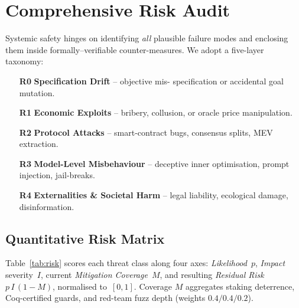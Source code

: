 \documentclass[11pt]{article}
\theoremstyle{plain}
\begin{document}
\section{Comprehensive Risk Audit}\label{sec:risk}

Systemic safety hinges on identifying \emph{all} plausible failure
modes and enclosing them inside formally–verifiable counter-measures.
We adopt a five-layer taxonomy:

\begin{enumerate}\itemsep2pt
\item[\textbf{R0}] \textbf{Specification Drift} – objective mis-
        specification or accidental goal mutation.
\item[\textbf{R1}] \textbf{Economic Exploits} – bribery, collusion, or
        oracle price manipulation.
\item[\textbf{R2}] \textbf{Protocol Attacks} – smart-contract bugs,
        consensus splits, MEV extraction.
\item[\textbf{R3}] \textbf{Model-Level Misbehaviour} – deceptive inner
        optimisation, prompt injection, jail-breaks.
\item[\textbf{R4}] \textbf{Externalities \& Societal Harm} – legal
        liability, ecological damage, disinformation.
\end{enumerate}

\subsection{Quantitative Risk Matrix}

Table~\ref{tab:risk} scores each threat class along four axes:
\textit{Likelihood}~$p$, \textit{Impact} severity~$I$, current
\textit{Mitigation Coverage}~$M$, and resulting
\textit{Residual Risk}~$p\,I\,(1-M)$, normalised to~$[0,1]$.
Coverage $M$ aggregates staking deterrence, Coq-certified guards,
and red-team fuzz depth (weights $0.4/0.4/0.2$).
\end{document}
